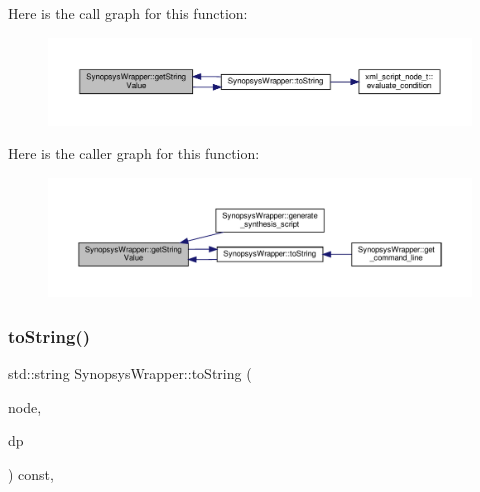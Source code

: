 Here is the call graph for this function\+:
\nopagebreak
\begin{figure}[H]
\begin{center}
\leavevmode
\includegraphics[width=350pt]{d7/d59/classSynopsysWrapper_a2466100fbd55e3ec1c466841d35aa2d9_cgraph}
\end{center}
\end{figure}
Here is the caller graph for this function\+:
\nopagebreak
\begin{figure}[H]
\begin{center}
\leavevmode
\includegraphics[width=350pt]{d7/d59/classSynopsysWrapper_a2466100fbd55e3ec1c466841d35aa2d9_icgraph}
\end{center}
\end{figure}
\mbox{\label{classSynopsysWrapper_abdd13f9bc68c225978b5a29ac6250df2}} 
\subsubsection{\texorpdfstring{to\+String()}{toString()}}
{\footnotesize\ttfamily std\+::string Synopsys\+Wrapper\+::to\+String (\begin{DoxyParamCaption}\item[{const \hyperlink{xml__script__command_8hpp_a1fe3d50ade66bc35e41be9b68bbbcd02}{xml\+\_\+script\+\_\+node\+\_\+t\+Ref}}]{node,  }\item[{const \hyperlink{DesignParameters_8hpp_ae36bb1c4c9150d0eeecfe1f96f42d157}{Design\+Parameters\+Ref}}]{dp }\end{DoxyParamCaption}) const\hspace{0.3cm}{\ttfamily [override]}, {\ttfamily [virtual]}}



